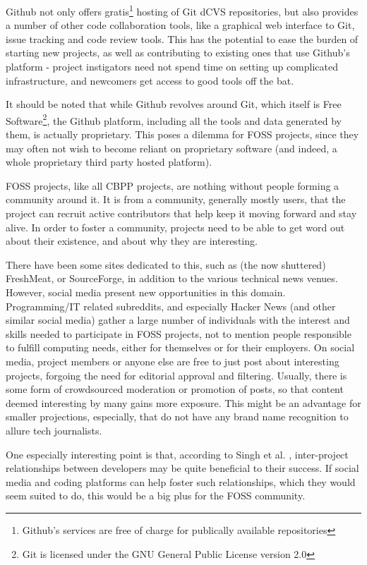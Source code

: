 \documentclass[a4paper,11pt]{article} %
\begin{document}
Github not only offers gratis\footnote{Github's services are free of
  charge for publically available repositories} hosting of Git dCVS
repositories, but also provides a number of other code collaboration
tools, like a graphical web interface to Git, issue tracking and code
review tools. This has the potential to ease the burden of starting
new projects, as well as contributing to existing ones that use
Github's platform - project instigators need not spend time on setting
up complicated infrastructure, and newcomers get access to good tools
off the bat.

It should be noted that while Github revolves around Git, which itself
is Free Software\footnote{Git is licensed under the GNU General Public
  License version 2.0}, the Github platform, including all the tools
and data generated by them, is actually proprietary. This poses a
dilemma for FOSS projects, since they may often not wish to become
reliant on proprietary software (and indeed, a whole proprietary third
party hosted platform).


FOSS projects, like all CBPP projects, are nothing without people
forming a community around it. It is from a community, generally
mostly users, that the project can recruit active contributors that
help keep it moving forward and stay alive. In order to foster a
community, projects need to be able to get word out about their
existence, and about why they are interesting.

There have been some sites dedicated to this, such as (the now
shuttered) FreshMeat, or SourceForge, in addition to the various
technical news venues. However, social media present new opportunities
in this domain. Programming/IT related subreddits, and especially
Hacker News (and other similar social media) gather a large number of
individuals with the interest and skills needed to participate in FOSS
projects, not to mention people responsible to fulfill computing
needs, either for themselves or for their employers.  On social media,
project members or anyone else are free to just post about interesting
projects, forgoing the need for editorial approval and
filtering. Usually, there is some form of crowdsourced moderation or
promotion of posts, so that content deemed interesting by many gains
more exposure. This might be an advantage for smaller projections,
especially, that do not have any brand name recognition to allure tech
journalists.

One especially interesting point is that, according to Singh et
al. \cite{singh2011network}, inter-project relationships between
developers may be quite beneficial to their success. If social media
and coding platforms can help foster such relationships, which they
would seem suited to do, this would be a big plus for the FOSS
community.
\end{document}
